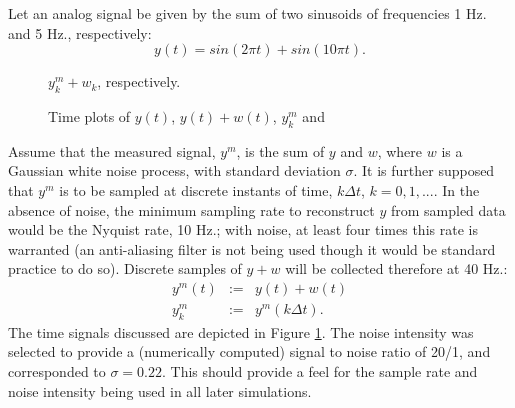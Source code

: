 Let an analog signal be given by the sum of two sinusoids of frequencies 1 Hz. and
5 Hz., respectively:
\begin{equation}
y(t) = sin(2 \pi t) + sin(10 \pi t).
\label{sines}
\end{equation}

\begin{figure}[hbt]
\centerline{}
\smallskip
\small
\caption{\small Time plots of $y(t)$, $y(t) + w(t)$, $y^m_k$ and}
$y^m_k + w_k$, respectively.
\label{signals}
\end{figure}


Assume that the measured signal, $y^m$, is the sum of $y$ and $w$, where $w$ is a
Gaussian white noise process, with standard deviation $\sigma$.  
It is further supposed that
$y^m$ is to be sampled at discrete instants of time,
$k \Delta t$, $k = 0, 1, ...$.  In the absence of noise, the minimum sampling rate 
to reconstruct $y$ from sampled data would be the Nyquist rate, 10 Hz.; with
noise,
at least four times this rate is warranted (an anti-aliasing filter is not
being used
though it would be standard practice to do so).
Discrete samples of $y + w$ will be collected therefore
at 40 Hz.:
\begin{eqnarray}
y^m(t) &:=& y(t) + w(t) \\
y^m_k & :=& y^m(k \Delta t). \nonumber
\label{ysampled}
\end{eqnarray}
The time signals discussed are depicted in Figure \ref{signals}.  The noise
intensity was selected to provide a (numerically computed)
signal to noise ratio of 20/1, and
corresponded to $\sigma = 0.22$. This should 
provide a feel for the sample rate and noise intensity being used in all later
simulations.


